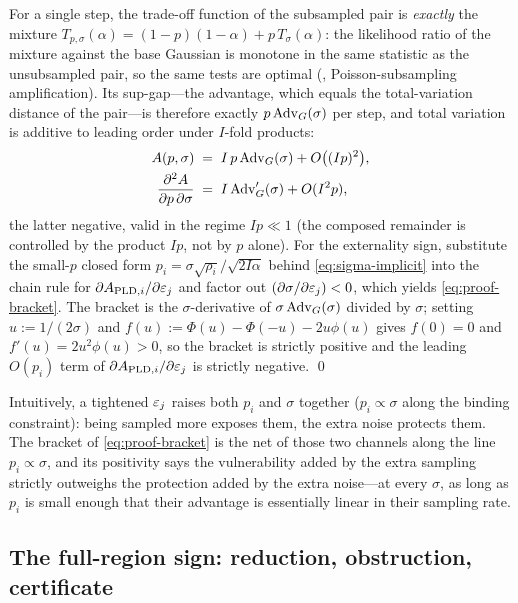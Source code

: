 For a single step, the trade-off function of the subsampled pair is
\emph{exactly} the mixture $T_{p,\sigma}(\alpha) = (1-p)(1-\alpha) +
p\, T_\sigma(\alpha)$: the likelihood ratio of the mixture against
the base Gaussian is monotone in the same statistic as the
unsubsampled pair, so the same tests are optimal
(\cite{balle2020privacy}, Poisson-subsampling amplification). Its
sup-gap---the advantage, which equals the total-variation distance of
the pair---is therefore exactly $p\,\mathrm{Adv}_G(\sigma)$ per step, and
total variation is additive to leading order under $I$-fold products:
\begin{align*}
A(p,\sigma) &\;=\; I\, p\, \mathrm{Adv}_G(\sigma) + O\bigl((I p)^2\bigr),\\
\frac{\partial^2 A}{\partial p\, \partial \sigma}
    &\;=\; I\,\mathrm{Adv}_G'(\sigma) + O(I^2 p),
\end{align*}
the latter negative, valid in the regime $I p \ll 1$ (the composed
remainder is controlled by the product $Ip$, not by $p$ alone).
For the externality sign, substitute the small-$p$ closed
form $p_i = \sigma\sqrt{\rho_i}/\sqrt{2I\alpha}$ behind
\eqref{eq:sigma-implicit} into the chain rule for $\partial
A_{\mathrm{PLD},i}/\partial\varepsilon_j$ and factor out
$(\partial\sigma/\partial\varepsilon_j)<0$, which yields
\eqref{eq:proof-bracket}. The bracket is the $\sigma$-derivative of
$\sigma\,\mathrm{Adv}_G(\sigma)$ divided by $\sigma$; setting $u :=
1/(2\sigma)$ and $f(u) := \Phi(u) - \Phi(-u) - 2u\phi(u)$ gives
$f(0)=0$ and $f'(u) = 2u^2\phi(u) > 0$, so the bracket is strictly
positive and the leading $O(p_i)$ term of $\partial
A_{\mathrm{PLD},i}/\partial\varepsilon_j$ is strictly negative. \qed

Intuitively, a tightened $\varepsilon_j$ raises both $p_i$ and $\sigma$
together ($p_i \propto \sigma$ along the binding constraint):
being sampled more exposes them, the extra noise protects them. The
bracket of \eqref{eq:proof-bracket} is the net of those two channels
along the line $p_i \propto \sigma$, and its positivity says the
vulnerability added by the extra sampling strictly outweighs the
protection added by the extra noise---at
every $\sigma$, as long as $p_i$ is small enough that their
advantage is essentially linear in their sampling rate.

\subsection{The full-region sign: reduction, obstruction,
certificate}
\label{app:proof-full-region}

